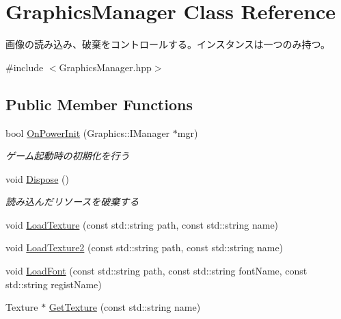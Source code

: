 \hypertarget{class_graphics_manager}{}\section{Graphics\+Manager Class Reference}
\label{class_graphics_manager}


画像の読み込み、破棄をコントロールする。インスタンスは一つのみ持つ。  




{\ttfamily \#include $<$Graphics\+Manager.\+hpp$>$}

\subsection*{Public Member Functions}
\begin{DoxyCompactItemize}
\item 
bool \hyperlink{class_graphics_manager_a3855839d0ac22373eb85a821f88d7f77}{On\+Power\+Init} (Graphics\+::\+I\+Manager $\ast$mgr)\hypertarget{class_graphics_manager_a3855839d0ac22373eb85a821f88d7f77}{}\label{class_graphics_manager_a3855839d0ac22373eb85a821f88d7f77}

\begin{DoxyCompactList}\small\item\em ゲーム起動時の初期化を行う \end{DoxyCompactList}\item 
void \hyperlink{class_graphics_manager_aaffde352f9d9edcb7bc00c756b5ff7ec}{Dispose} ()\hypertarget{class_graphics_manager_aaffde352f9d9edcb7bc00c756b5ff7ec}{}\label{class_graphics_manager_aaffde352f9d9edcb7bc00c756b5ff7ec}

\begin{DoxyCompactList}\small\item\em 読み込んだリソースを破棄する \end{DoxyCompactList}\item 
void \hyperlink{class_graphics_manager_a5aaa3946913d78085220f1c112da82ca}{Load\+Texture} (const std\+::string path, const std\+::string name)
\item 
void \hyperlink{class_graphics_manager_a6d53401e0d3ef8f187ee7db70270056d}{Load\+Texture2} (const std\+::string path, const std\+::string name)
\item 
void \hyperlink{class_graphics_manager_a0dff6d46fc42021eba1d81d72c6946ed}{Load\+Font} (const std\+::string path, const std\+::string font\+Name, const std\+::string regist\+Name)
\item 
Texture $\ast$ \hyperlink{class_graphics_manager_a5fe2ed3a63f3cb65031b3d37c4dd3f0a}{Get\+Texture} (const std\+::string name)\hypertarget{class_graphics_manager_a5fe2ed3a63f3cb65031b3d37c4dd3f0a}{}\label{class_graphics_manager_a5fe2ed3a63f3cb65031b3d37c4dd3f0a}


\end{DoxyCompactItemize}
